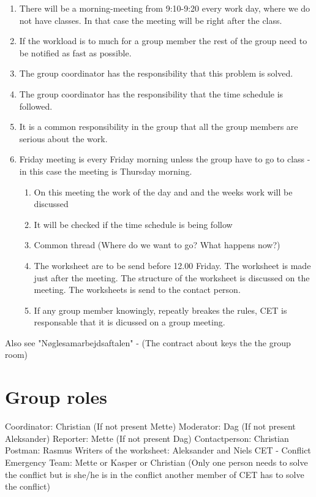 \begin{enumerate}
\item There will be a morning-meeting from 9:10-9:20 every work day, where we do not have classes. In that case the meeting will be right after the class.
\item If the workload is to much for a group member the rest of the group need to be notified as fast as possible.
\item The group coordinator has the responsibility that this problem is solved. 
\item The group coordinator has the responsibility that the time schedule is followed.
\item It is a common responsibility in the group that all the group members are serious about the work.
\item Friday meeting is every Friday morning unless the group have to go to class - in this case the meeting is Thursday morning. 		\begin{enumerate}
	\item On this meeting the work of the day and and the weeks work will be discussed 
\item It will be checked if the time schedule is being follow 
\item Common thread (Where do we want to go? What happens now?) 
\item The worksheet are to be send before 12.00 Friday. The worksheet is made just after the meeting. The structure of the worksheet is discussed on the meeting. The worksheets is send to the contact person.
\item If any group member knowingly, repeatly breakes the rules, CET is responsable that it is dicussed on a group meeting.  
\end{enumerate}
\end{enumerate}

Also see "Nøglesamarbejdsaftalen" - (The contract about keys the the group room)

\section*{Group roles}

Coordinator: Christian (If not present Mette)
\newline
\newline
Moderator: Dag (If not present Aleksander)
\newline
\newline
Reporter: Mette (If not present Dag)
\newline
\newline
Contactperson: Christian
\newline
\newline
Postman: Rasmus
\newline
\newline
Writers of the worksheet: Aleksander and Niels
\newline
\newline
CET - Conflict Emergency Team: Mette or Kasper or Christian (Only one person needs to solve the conflict but is she/he is in the conflict another member of CET has to solve the conflict)

